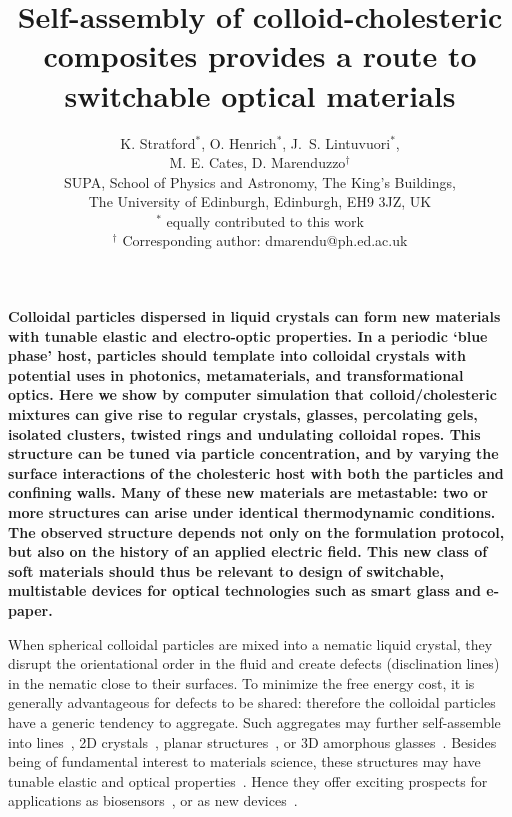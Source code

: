 \documentclass[12pt]{article}
\begin{document}
\title{Self-assembly of colloid-cholesteric composites provides
a route to switchable optical materials}

\author{K. Stratford$^{*}$, O. Henrich$^{*}$, J.~S. Lintuvuori$^{*}$,\\
M. E. Cates, D. Marenduzzo$^\dagger$ \\ 
SUPA, School of Physics and Astronomy, The King's Buildings,\\
The University of Edinburgh, Edinburgh, EH9 3JZ, UK\\
\small{$^{*}$ equally contributed to this work}\\
\small{$^\dagger$ Corresponding author: dmarendu@ph.ed.ac.uk}
}
\date{}

\maketitle

\noindent

\noindent
{\bf
Colloidal particles dispersed in liquid crystals can form new materials
with tunable elastic and electro-optic properties. In a periodic `blue
phase' host, particles should template into colloidal crystals with
potential uses in photonics, metamaterials, and transformational optics.
Here we show by computer simulation that colloid/cholesteric mixtures can
give rise to regular crystals, glasses, percolating gels, isolated clusters,
twisted rings and undulating colloidal ropes. This structure can be tuned
via particle concentration, and by varying the surface interactions of the
cholesteric host with both
the particles and confining walls. Many of these new materials are metastable:
two or more structures can arise under identical thermodynamic conditions.
The observed structure depends not only on the formulation protocol, but also
on the history of an applied electric field. This new class of soft materials
should thus be relevant to design of switchable, multistable devices for
optical technologies such as smart glass and e-paper.
}


\bigskip
\noindent

\noindent
When spherical colloidal particles are mixed into a nematic liquid crystal, 
they disrupt the orientational order in the fluid and create defects (disclination lines) in the nematic close to their surfaces. To minimize the free energy cost, it is generally advantageous for defects to be shared:
therefore the colloidal particles have a generic tendency to aggregate. Such aggregates may further 
self-assemble into lines~\cite{wiresmiha}, 2D crystals~\cite{zumer}, 
planar structures~\cite{tanaka}, or 3D amorphous glasses~\cite{tiffany}.
Besides being of fundamental interest to materials science, these
structures may have tunable elastic and optical properties~\cite{stark}. Hence 
they offer exciting prospects for applications as biosensors~\cite{abbott}, or
as new devices~\cite{colloiddevice,tanakanatmat}.
\end{document}
